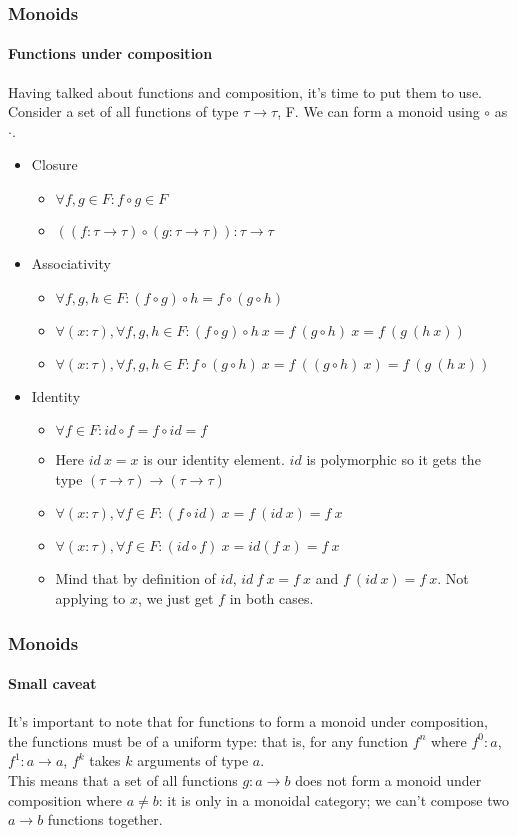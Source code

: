 \documentclass{beamer}
\begin{document}
\begin{frame}
  \frametitle{Monoids}
  \framesubtitle{Functions under composition}
  Having talked about functions and composition, it's time to put them to use. Consider a set of all functions of type $\tau \rightarrow \tau$,
  F. We can form a monoid using $\circ$ as $\cdot$.
  \pause
  \begin{itemize}[<+->]
    \item Closure
      \begin{itemize}
        \item $\forall f,g \in F : f \circ g \in F$
        \item $((f:\tau \rightarrow \tau) \circ (g:\tau \rightarrow \tau)):\tau \rightarrow \tau$
      \end{itemize}
    \item Associativity
      \begin{itemize}
        \item $\forall f,g,h \in F : (f \circ g) \circ h = f
          \circ (g \circ h)$
        \item $\forall (x:\tau),\forall f,g,h \in F : (f \circ g) \circ
          h\:x = f\:(g \circ h)\:x = f\:(g\:(h\:x))$
        \item $\forall (x:\tau),\forall f,g,h \in F : f \circ (g \circ
          h)\:x = f\:((g \circ h)\:x) = f\:(g\:(h\:x))$
      \end{itemize}
    \item Identity
      \begin{itemize}
        \item $\forall f \in F: id \circ f = f \circ id = f$
        \item Here $id\:x = x$ is our identity element. $id$ is
          polymorphic so it gets the type $(\tau \rightarrow \tau)
          \rightarrow (\tau \rightarrow \tau)$
        \item $\forall (x:\tau),\forall f \in F: (f \circ id)\:x = f\:(id\:x) = f\:x$
        \item $\forall (x:\tau),\forall f \in F: (id \circ f)\:x =
          id(f\:x) = f\:x$
        \item Mind that by definition of $id$, $id\:f\:x = f\:x$ and
          $f\:(id\:x) = f\:x$. Not applying to $x$, we just get $f$ in
          both cases.
      \end{itemize}
  \end{itemize}
\end{frame}
\begin{frame}
  \frametitle{Monoids}
  \framesubtitle{Small caveat}
  It's important to note that for functions to form a monoid under
  composition, the functions must be of a uniform type: that is, for
  any function $f^n$ where $f^0:a$, $f^1:a \rightarrow a$, $f^k$ takes
  $k$ arguments of type $a$.\\
  \pause
  This means that a set of all functions $g:a \rightarrow b$ does not
  form a monoid under composition where $a \neq b$: it is only in a
  monoidal category; we can't compose two $a \rightarrow b$ functions
  together.\\
  \pause
\end{frame}
\end{document}
